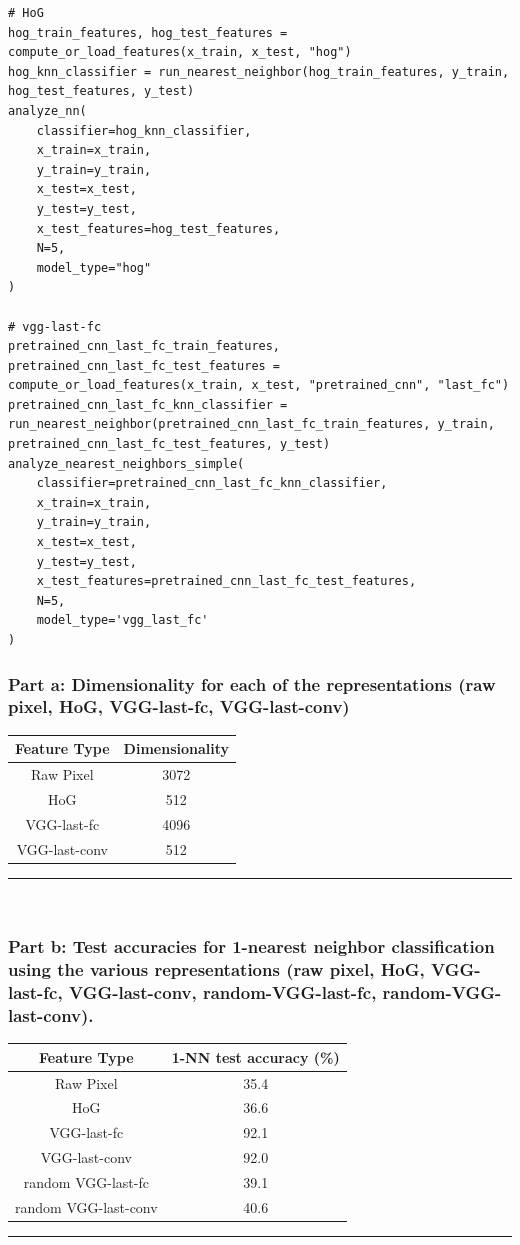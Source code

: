 \documentclass{article}
\begin{document}
\begin{lstlisting}
# HoG
hog_train_features, hog_test_features = compute_or_load_features(x_train, x_test, "hog")
hog_knn_classifier = run_nearest_neighbor(hog_train_features, y_train, hog_test_features, y_test)
analyze_nn(
    classifier=hog_knn_classifier,
    x_train=x_train,  
    y_train=y_train,
    x_test=x_test,    
    y_test=y_test,
    x_test_features=hog_test_features, 
    N=5,
    model_type="hog"
)

# vgg-last-fc
pretrained_cnn_last_fc_train_features, pretrained_cnn_last_fc_test_features = compute_or_load_features(x_train, x_test, "pretrained_cnn", "last_fc")
pretrained_cnn_last_fc_knn_classifier = run_nearest_neighbor(pretrained_cnn_last_fc_train_features, y_train, pretrained_cnn_last_fc_test_features, y_test)
analyze_nearest_neighbors_simple(
    classifier=pretrained_cnn_last_fc_knn_classifier,
    x_train=x_train,  
    y_train=y_train,
    x_test=x_test,    
    y_test=y_test,
    x_test_features=pretrained_cnn_last_fc_test_features, 
    N=5,
    model_type='vgg_last_fc'
)
\end{lstlisting}
\subsubsection*{Part a: Dimensionality for each of the representations (raw pixel, HoG, VGG-last-fc, VGG-last-conv)}
\begin{center} 
  \begin{tabular}{|c|c|} 
    \hline Feature Type & Dimensionality \\ 
    \hline 
    Raw Pixel & 3072 \\ 
    HoG & 512  \\
    VGG-last-fc & 4096 \\
    VGG-last-conv & 512 \\ 
    \hline
  \end{tabular}
\end{center}

\noindent\rule{\textwidth}{0.4pt}\\

\subsubsection*{Part b: Test accuracies for 1-nearest neighbor classification using the various representations (raw pixel, HoG, VGG-last-fc, VGG-last-conv, random-VGG-last-fc, random-VGG-last-conv).}
\begin{center} 
  \begin{tabular}{|c|c|} 
    \hline Feature Type & 1-NN test accuracy (\%) \\ 
    \hline 
    Raw Pixel & 35.4 \\ 
    HoG & 36.6  \\
    VGG-last-fc & 92.1 \\
    VGG-last-conv & 92.0 \\
    random VGG-last-fc & 39.1 \\
    random VGG-last-conv & 40.6 \\ 
    \hline
  \end{tabular}
\end{center}
\noindent\rule{\textwidth}{0.4pt}\\
\end{document}
